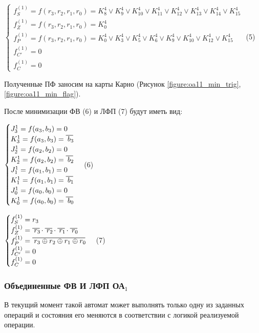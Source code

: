 $
\begin{cases}
f^{(1)}_{S} = f(r_3, r_2, r_1, r_0) = K^4_8 \vee K^4_9 \vee K^4_{10} \vee K^4_{11} \vee K^4_{12} \vee K^4_{13} \vee K^4_{14} \vee K^4_{15}
\\
f^{(1)}_{Z} = f(r_3, r_2, r_1, r_0) = K^4_0
\\
f^{(1)}_{P} = f(r_3, r_2, r_1, r_0) = K^4_0 \vee K^4_3 \vee K^4_5 \vee K^4_6 \vee K^4_9 \vee K^4_{10} \vee K^4_{12} \vee K^4_{15}
\\
f^{(1)}_{C'}= 0
\\
f^{(1)}_{C} = 0
\end{cases}
$ (5)

Полученные ПФ заносим на карты Карно (Рисунок \ref{figure:oa11_min_trig}, \ref{figure:oa11_min_flag}).



После минимизации ФВ (6) и ЛФП (7) будут иметь вид:

$
\begin{cases}
J^1_3 = f(a_3, b_3) = 0
\\
K^1_3 = f(a_3, b_3) = \oline{b_3}
\\
J^1_2 = f(a_2, b_2) = 0
\\
K^1_2 = f(a_2, b_2) = \oline{b_2}
\\
J^1_1 = f(a_1, b_1) = 0
\\
K^1_1 = f(a_1, b_1) = \oline{b_1}
\\
J^1_0 = f(a_0, b_0) = 0
\\
K^1_0 = f(a_0, b_0) = \oline{b_0}
\end{cases}
$ (6)

$
\begin{cases}
f^{(1)}_{S} = r_3
\\
f^{(1)}_{Z} = \oline{r_3} \cdot \oline{r_2} \cdot \oline{r_1} \cdot \oline{r_0}
\\
f^{(1)}_{P} = \oline{r_3 \oplus r_2 \oplus r_1 \oplus r_0}
\\
f^{(1)}_{C'}= 0
\\
f^{(1)}_{C} = 0
\end{cases}
$ (7)


\subsubsection{Объединенные ФВ И ЛФП ОА${}_1$}

В текущий момент такой автомат может выполнять только одну из заданных операций и состояния его меняются в соответствии с логикой реализуемой операции.


